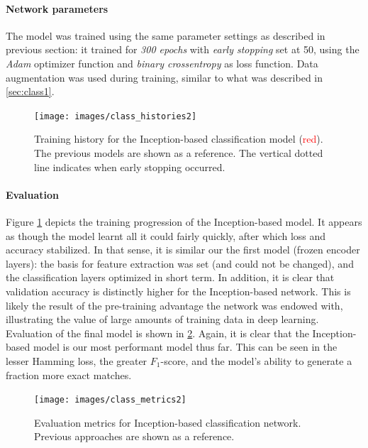 \paragraph{Network parameters} The model was trained using the same parameter settings as described in previous section: it trained for \textit{300 epochs} with \textit{early stopping} set at 50, using the \textit{Adam} optimizer function and \textit{binary crossentropy} as loss function. Data augmentation was used during training, similar to what was described in \ref{sec:class1}.

\begin{figure}[!htbp]
	\begin{center}
		\texttt{[image: images/class\_histories2]}
		\caption{Training history for the Inception-based classification model (\textcolor{red}{red}). The previous models are shown as a reference. The vertical dotted line indicates when early stopping occurred.}
		\label{fig:class_histories2}
	\end{center}
\end{figure}

\paragraph{Evaluation}
Figure \ref{fig:class_histories2} depicts the training progression of the Inception-based model. It appears as though the model learnt all it could fairly quickly, after which loss and accuracy stabilized. In that sense, it is similar our the first model (frozen encoder layers): the basis for feature extraction was set (and could not be changed), and the classification layers optimized in short term. In addition, it is clear that validation accuracy is distinctly higher for the Inception-based network. This is likely the result of the pre-training advantage the network was endowed with, illustrating the value of large amounts of training data in deep learning. Evaluation of the final model is shown in \ref{fig:class_metrics2}. Again, it is clear that the Inception-based model is our most performant model thus far. This can be seen in the lesser Hamming loss, the greater $F_1$-score, and the model's ability to generate a fraction more exact matches.

\begin{figure}[!htbp]
	\begin{center}
		\texttt{[image: images/class\_metrics2]}
		\caption{Evaluation metrics for Inception-based classification network. Previous approaches are shown as a reference.}
		\label{fig:class_metrics2}
	\end{center}
\end{figure}




